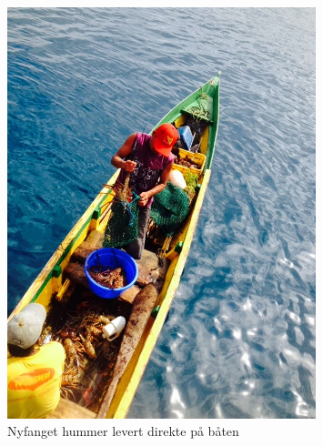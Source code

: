 \begin{figure}[H]
	\centering
	\includegraphics[width=0.8\textwidth]{kjophummer}
	\caption*{Nyfanget hummer levert direkte på båten}
	\label{fig:hummer}
\end{figure}
\thispagestyle{empty}

